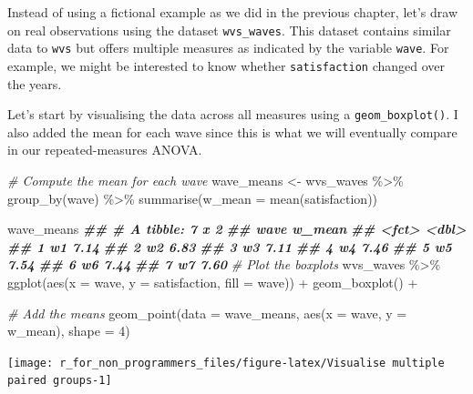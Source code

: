 \documentclass[
]{book}
\newenvironment{Shaded}{\begin{snugshade}}{\end{snugshade}}
\newcommand{\AttributeTok}[1]{\textcolor[rgb]{0.77,0.63,0.00}{#1}}
\newcommand{\CommentTok}[1]{\textcolor[rgb]{0.56,0.35,0.01}{\textit{#1}}}
\newcommand{\DecValTok}[1]{\textcolor[rgb]{0.00,0.00,0.81}{#1}}
\newcommand{\DocumentationTok}[1]{\textcolor[rgb]{0.56,0.35,0.01}{\textbf{\textit{#1}}}}
\newcommand{\FunctionTok}[1]{\textcolor[rgb]{0.00,0.00,0.00}{#1}}
\newcommand{\NormalTok}[1]{#1}
\newcommand{\OtherTok}[1]{\textcolor[rgb]{0.56,0.35,0.01}{#1}}
\newcommand{\SpecialCharTok}[1]{\textcolor[rgb]{0.00,0.00,0.00}{#1}}
\begin{document}
Instead of using a fictional example as we did in the previous chapter, let's draw on real observations using the dataset \texttt{wvs\_waves}. This dataset contains similar data to \texttt{wvs} but offers multiple measures as indicated by the variable \texttt{wave}. For example, we might be interested to know whether \texttt{satisfaction} changed over the years.

Let's start by visualising the data across all measures using a \texttt{geom\_boxplot()}. I also added the mean for each wave since this is what we will eventually compare in our repeated-measures ANOVA.

\begin{Shaded}
\begin{Highlighting}[]
\CommentTok{\# Compute the mean for each wave}
\NormalTok{wave\_means }\OtherTok{\textless{}{-}}\NormalTok{ wvs\_waves }\SpecialCharTok{\%\textgreater{}\%}
  \FunctionTok{group\_by}\NormalTok{(wave) }\SpecialCharTok{\%\textgreater{}\%}
  \FunctionTok{summarise}\NormalTok{(}\AttributeTok{w\_mean =} \FunctionTok{mean}\NormalTok{(satisfaction))}

\NormalTok{wave\_means}
\DocumentationTok{\#\# \# A tibble: 7 x 2}
\DocumentationTok{\#\#   wave  w\_mean}
\DocumentationTok{\#\#   \textless{}fct\textgreater{}  \textless{}dbl\textgreater{}}
\DocumentationTok{\#\# 1 w1      7.14}
\DocumentationTok{\#\# 2 w2      6.83}
\DocumentationTok{\#\# 3 w3      7.11}
\DocumentationTok{\#\# 4 w4      7.46}
\DocumentationTok{\#\# 5 w5      7.54}
\DocumentationTok{\#\# 6 w6      7.44}
\DocumentationTok{\#\# 7 w7      7.60}
\CommentTok{\# Plot the boxplots}
\NormalTok{wvs\_waves }\SpecialCharTok{\%\textgreater{}\%}
  \FunctionTok{ggplot}\NormalTok{(}\FunctionTok{aes}\NormalTok{(}\AttributeTok{x =}\NormalTok{ wave,}
             \AttributeTok{y =}\NormalTok{ satisfaction,}
             \AttributeTok{fill =}\NormalTok{ wave)) }\SpecialCharTok{+}
  \FunctionTok{geom\_boxplot}\NormalTok{() }\SpecialCharTok{+}

  \CommentTok{\# Add the means}
  \FunctionTok{geom\_point}\NormalTok{(}\AttributeTok{data =}\NormalTok{ wave\_means,}
             \FunctionTok{aes}\NormalTok{(}\AttributeTok{x =}\NormalTok{ wave,}
                 \AttributeTok{y =}\NormalTok{ w\_mean),}
             \AttributeTok{shape =} \DecValTok{4}\NormalTok{)}
\end{Highlighting}
\end{Shaded}

\begin{center}\texttt{[image: r\_for\_non\_programmers\_files/figure-latex/Visualise multiple paired groups-1]} \end{center}
\end{document}
